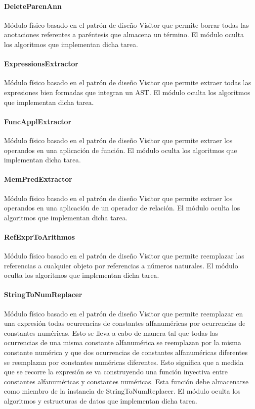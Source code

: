 \documentclass[a4paper,10pt]{report}
\begin{document}
				\paragraph{DeleteParenAnn}
				Módulo físico basado en el patrón de diseño Visitor que permite borrar todas las anotaciones referentes a paréntesis que almacena un término. El módulo oculta los algoritmos que implementan dicha tarea.
				\paragraph{ExpressionsExtractor}
				Módulo físico basado en el patrón de diseño Visitor que permite extraer todas las expresiones bien formadas que integran un AST. El módulo oculta los algoritmos que implementan dicha tarea.
				\paragraph{FuncApplExtractor}
				Módulo físico basado en el patrón de diseño Visitor que permite extraer los operandos en una aplicación de función. El módulo oculta los algoritmos que implementan dicha tarea.
				\paragraph{MemPredExtractor}
				Módulo físico basado en el patrón de diseño Visitor que permite extraer los operandos en una aplicación de un operador de relación. El módulo oculta los algoritmos que implementan dicha tarea.
				\paragraph{RefExprToArithmos}
				Módulo físico basado en el patrón de diseño Visitor que permite reemplazar las referencias a cualquier objeto por referencias a números naturales. El módulo oculta los algoritmos que implementan dicha tarea.
				\paragraph{StringToNumReplacer}
				Módulo físico basado en el patrón de diseño Visitor que permite reemplazar en una expresión todas ocurrencias de constantes alfanuméricas por ocurrencias de constantes numéricas. Esto se lleva a cabo de manera tal que todas las ocurrencias de una misma constante alfanumérica se reemplazan por la misma constante numérica y que dos ocurrencias de constantes alfanuméricas diferentes se reemplazan por constantes numéricas diferentes. Esto significa que a medida que se recorre la expresión se va construyendo una función inyectiva entre constantes alfanuméricas y constantes numéricas. Esta función debe almacenarse como miembro de la instancia de StringToNumReplacer. El módulo oculta los algoritmos y estructuras de datos que implementan dicha tarea.
\end{document}
